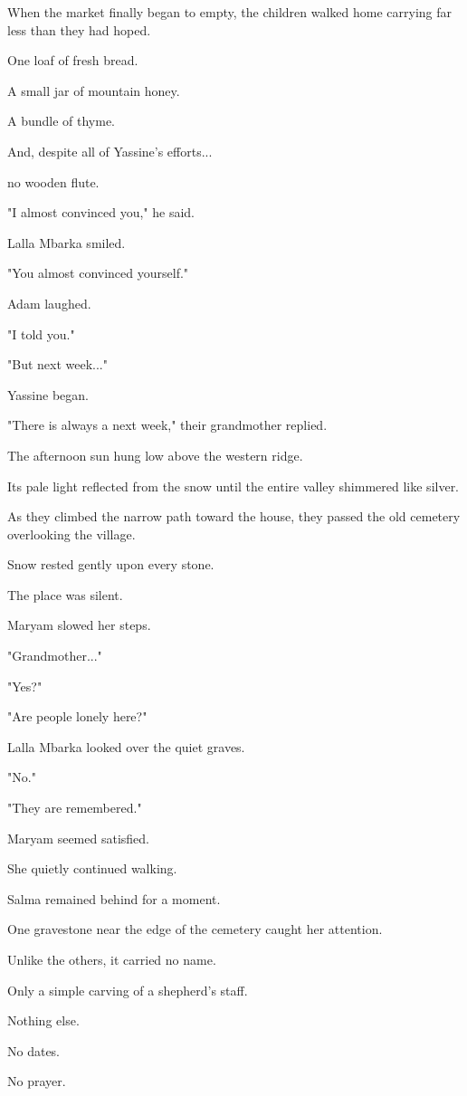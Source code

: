 \documentclass[12pt,openany]{book}
\begin{document}
When the market finally began to empty, the children walked home carrying far less than they had hoped.

One loaf of fresh bread.

A small jar of mountain honey.

A bundle of thyme.

And, despite all of Yassine's efforts...

no wooden flute.

"I almost convinced you," he said.

Lalla Mbarka smiled.

"You almost convinced yourself."

Adam laughed.

"I told you."

"But next week..."

Yassine began.

"There is always a next week," their grandmother replied.

The afternoon sun hung low above the western ridge.

Its pale light reflected from the snow until the entire valley shimmered like silver.

As they climbed the narrow path toward the house, they passed the old cemetery overlooking the village.

Snow rested gently upon every stone.

The place was silent.

Maryam slowed her steps.

"Grandmother..."

"Yes?"

"Are people lonely here?"

Lalla Mbarka looked over the quiet graves.

"No."

"They are remembered."

Maryam seemed satisfied.

She quietly continued walking.

Salma remained behind for a moment.

One gravestone near the edge of the cemetery caught her attention.

Unlike the others, it carried no name.

Only a simple carving of a shepherd's staff.

Nothing else.

No dates.

No prayer.
\end{document}
